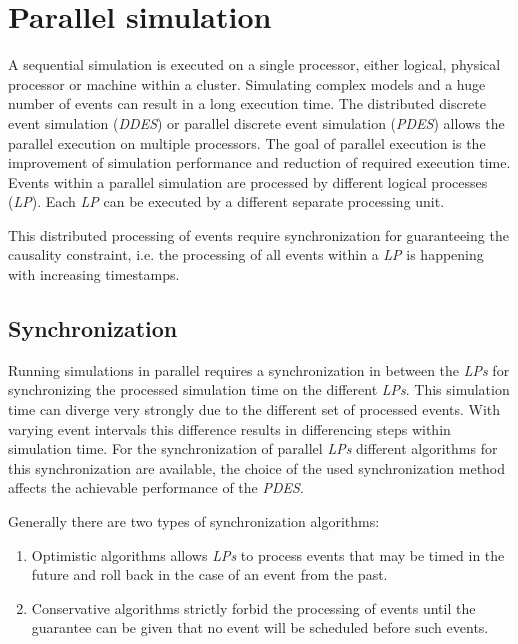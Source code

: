 \chapter{Parallel simulation}
\label{cha:parallel_sim}
A sequential simulation is executed on a single processor, either logical, physical processor or machine within a cluster.
Simulating complex models and a huge number of events can result in a long execution time.
The distributed discrete event simulation (\emph{DDES}) or parallel discrete event simulation (\emph{PDES}) allows the parallel execution on multiple processors.
The goal of parallel execution is the improvement of simulation performance and reduction of required execution time.
Events within a parallel simulation are processed by different logical processes (\emph{LP}).
Each \emph{LP} can be executed by a different separate processing unit. \cite{bagrodia_parsec_1998}

This distributed processing of events require synchronization for guaranteeing the causality constraint, i.e. the processing of all events within a \emph{LP} is happening with increasing timestamps.

\section{Synchronization}
\label{sec:parallel_synchronization}
Running simulations in parallel requires a synchronization in between the \emph{LPs} for synchronizing the processed simulation time on the different \emph{LPs}.
This simulation time can diverge very strongly due to the different set of processed events.
With varying event intervals this difference results in differencing steps within simulation time.
For the synchronization of parallel \emph{LPs} different algorithms for this synchronization are available, the choice of the used synchronization method affects the achievable performance of the \emph{PDES}.

Generally there are two types of synchronization algorithms:

\begin{enumerate}
    \item Optimistic algorithms allows \emph{LPs} to process events that may be timed in the future and roll back in the case of an event from the past.
    \item Conservative algorithms strictly forbid the processing of events until the guarantee can be given that no event will be scheduled before such events. \cite[chapter 2]{bagrodia_performance_2000}
\end{enumerate}


